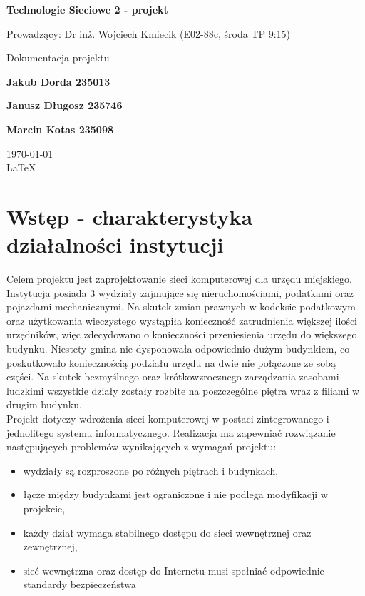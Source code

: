 \documentclass[12pt,a4paper]{article}
\begin{document}
	
	\begin{titlepage}
		
		\centering
		{\huge\bfseries Technologie Sieciowe 2 - projekt\par}
		
		\vspace{0.5cm}
		Prowadzący: Dr inż. Wojciech Kmiecik (E02-88c, środa TP 9:15) \\
	
		\vspace{1.1cm}
		{\Large Dokumentacja projektu\par}
		\vfill
		
		{\large\bfseries Jakub Dorda 235013\par}
		{\large\bfseries Janusz Długosz 235746\par}
		{\large\bfseries Marcin Kotas 235098\par}
		
		\vspace{1cm}
		\today \\ \LaTeX
		
		\restoregeometry
	\end{titlepage}
	
	
	\tableofcontents
	\pagebreak
	
	\section{Wstęp - charakterystyka działalności instytucji}
	
	Celem projektu jest zaprojektowanie sieci komputerowej dla urzędu miejskiego. Instytucja posiada 3 wydziały zajmujące się	nieruchomościami, podatkami oraz pojazdami mechanicznymi. Na skutek zmian prawnych w kodeksie podatkowym oraz użytkowania wieczystego wystąpiła konieczność zatrudnienia większej ilości urzędników, więc zdecydowano o konieczności przeniesienia urzędu do większego budynku. Niestety gmina nie dysponowała odpowiednio dużym budynkiem, co poskutkowało koniecznością podziału urzędu na dwie nie połączone ze sobą części. Na skutek bezmyślnego oraz krótkowzrocznego zarządzania zasobami ludzkimi wszystkie działy zostały rozbite na poszczególne piętra wraz z filiami w drugim budynku.\\
	
	Projekt dotyczy wdrożenia sieci komputerowej w postaci zintegrowanego i jednolitego systemu informatycznego. Realizacja ma zapewniać rozwiązanie następujących problemów wynikających z wymagań projektu:
	\begin{itemize}
		\item wydziały są rozproszone po różnych piętrach i budynkach,
		\item łącze między budynkami jest ograniczone i nie podlega modyfikacji w projekcie,
		\item każdy dział wymaga stabilnego dostępu do sieci wewnętrznej oraz zewnętrznej,
		\item sieć wewnętrzna oraz dostęp do Internetu musi spełniać odpowiednie standardy bezpieczeństwa
	\end{itemize} 
	
\end{document}
